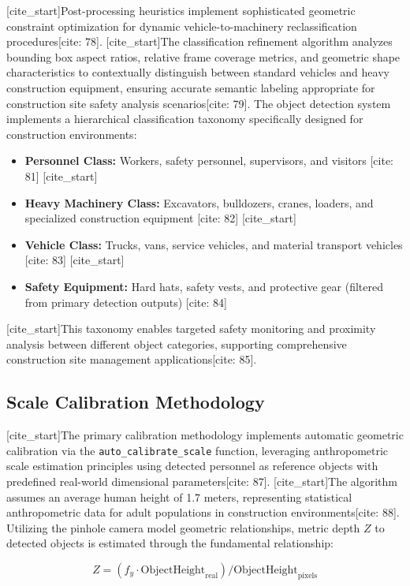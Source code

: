 [cite_start]Post-processing heuristics implement sophisticated geometric constraint optimization for dynamic vehicle-to-machinery reclassification procedures[cite: 78]. [cite_start]The classification refinement algorithm analyzes bounding box aspect ratios, relative frame coverage metrics, and geometric shape characteristics to contextually distinguish between standard vehicles and heavy construction equipment, ensuring accurate semantic labeling appropriate for construction site safety analysis scenarios[cite: 79]. The object detection system implements a hierarchical classification taxonomy specifically designed for construction environments:
\begin{itemize}
    [cite_start]\item \textbf{Personnel Class:} Workers, safety personnel, supervisors, and visitors [cite: 81]
    [cite_start]\item \textbf{Heavy Machinery Class:} Excavators, bulldozers, cranes, loaders, and specialized construction equipment [cite: 82]
    [cite_start]\item \textbf{Vehicle Class:} Trucks, vans, service vehicles, and material transport vehicles [cite: 83]
    [cite_start]\item \textbf{Safety Equipment:} Hard hats, safety vests, and protective gear (filtered from primary detection outputs) [cite: 84]
\end{itemize}
[cite_start]This taxonomy enables targeted safety monitoring and proximity analysis between different object categories, supporting comprehensive construction site management applications[cite: 85].

\subsection{Scale Calibration Methodology}
[cite_start]The primary calibration methodology implements automatic geometric calibration via the \texttt{auto\_calibrate\_scale} function, leveraging anthropometric scale estimation principles using detected personnel as reference objects with predefined real-world dimensional parameters[cite: 87]. [cite_start]The algorithm assumes an average human height of 1.7 meters, representing statistical anthropometric data for adult populations in construction environments[cite: 88]. Utilizing the pinhole camera model geometric relationships, metric depth $Z$ to detected objects is estimated through the fundamental relationship:

\begin{equation}
    Z = (f_y \cdot \text{ObjectHeight}_{\text{real}}) / \text{ObjectHeight}_{\text{pixels}}
\end{equation}

